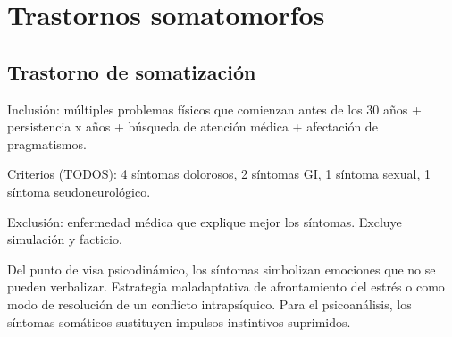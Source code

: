 \chapter{Trastornos somatomorfos}
\section*{Trastorno de somatización}
Inclusión: múltiples problemas físicos que comienzan antes de los 30 años + persistencia x años + búsqueda de atención médica + afectación de pragmatismos.

Criterios (TODOS): 4 síntomas dolorosos, 2 síntomas GI, 1 síntoma sexual, 1 síntoma seudoneurológico.

Exclusión: enfermedad médica que explique mejor los síntomas. Excluye simulación y facticio.

Del punto de visa psicodinámico, los síntomas simbolizan emociones que no se pueden verbalizar. Estrategia maladaptativa de afrontamiento del estrés o como modo de resolución de un conflicto intrapsíquico.
Para el psicoanálisis, los síntomas somáticos sustituyen impulsos instintivos suprimidos.

